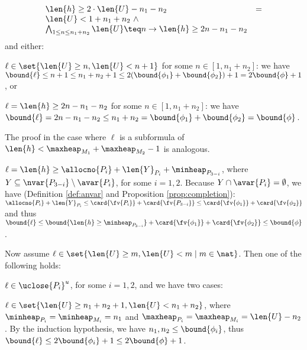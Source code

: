 {\begin{compactitem}
\begin{compactitem}
\[\begin{array}{ll}
        \len{h} \geq 2\cdot\len{U} - n_1 - n_2  & = \\
        \len{U} < 1 + n_1 + n_2 ~\wedge \\ 
        \bigwedge_{1 \leq n \leq n_1 + n_2} 
        \len{U} \teq n \rightarrow \len{h} \geq 2n - n_1 - n_2
        \end{array}\]
        and either:\begin{compactitem}
        \item $\ell \in \set{\len{U} \geq n, \len{U} < n+1}$ for some
          $n \in [1,n_1+n_2]$: we have $\bound{\ell} \leq n+1 \leq
          n_1+n_2+1 \leq 2(\bound{\phi_1} + \bound{\phi_2}) + 1 =
          2\bound{\phi}+1$, or
        \item $\ell = \len{h} \geq 2n - n_1 - n_2$ for some $n \in
          [1,n_1+n_2]$: we have $\bound{\ell} = 2n-n_1-n_2 \leq
          n_1+n_2 = \bound{\phi_1} + \bound{\phi_2} = \bound{\phi}$. 
        \end{compactitem}
      \item The proof in the case where $\ell$ is a subformula of $\len{h} <
        \maxheap_{M_1} + \maxheap_{M_2} - 1$ is analogous.
      \item $\ell = \len{h} \geq \allocno{P_i} + \len{Y}_{P_i} +
        \minheap_{P_{3-i}}$, where $Y \subseteq \nvar{P_{3-i}}
        \setminus \avar{P_i}$, for some $i=1,2$. Because $Y \cap
        \avar{P_i} = \emptyset$, we have (Definition \ref{def:anvar}
        and Proposition \ref{prop:completion}): $\allocno{P_i} +
        \len{Y}_{P_i} \leq \card{\fv{P_i}} + \card{\fv{P_{3-i}}} \leq
        \card{\fv{\phi_1}} + \card{\fv{\phi_2}}$ and thus
        $\bound{\ell} \leq \bound{\len{h} \geq \minheap_{P_{3-i}}} +
        \card{\fv{\phi_1}} + \card{\fv{\phi_2}} \leq \bound{\phi}$.
    \end{compactitem}
    Now assume $\ell \in \set{\len{U} \geq m, \len{U} < m \mid m \in \nat}$.
    Then one of the following holds:
    \begin{compactitem}
    \item $\ell \in \uclose{P_i}^u$, for some $i=1,2$, and we have two cases:
      \begin{compactitem}
      \item $\ell \in \set{\len{U} \geq n_1 + n_2 + 1,\len{U} <
        n_1+n_2}$, where $\minheap_{P_i}=\minheap_{M_i}=n_1$ and
        $\maxheap_{P_i}=\maxheap_{M_i}=\len{U}-n_2$. By the induction
        hypothesis, we have $n_1, n_2 \leq \bound{\phi_i}$, thus
        $\bound{\ell} \leq 2\bound{\phi_i}+1 \leq 2\bound{\phi}+1$.

\end{compactitem}
\end{compactitem}
\end{compactitem}}
